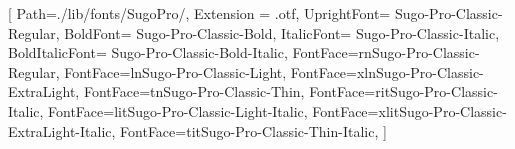 \setmainfont{SugoPro}[
    Path=./lib/fonts/SugoPro/,
    Extension = .otf,
    UprightFont=     Sugo-Pro-Classic-Regular,
    BoldFont=        Sugo-Pro-Classic-Bold,
    ItalicFont=      Sugo-Pro-Classic-Italic,
    BoldItalicFont=  Sugo-Pro-Classic-Bold-Italic,
    FontFace={r}{n}{Sugo-Pro-Classic-Regular},
    FontFace={l}{n}{Sugo-Pro-Classic-Light},
    FontFace={xl}{n}{Sugo-Pro-Classic-ExtraLight},
    FontFace={t}{n}{Sugo-Pro-Classic-Thin},
    FontFace={r}{it}{Sugo-Pro-Classic-Italic},
    FontFace={l}{it}{Sugo-Pro-Classic-Light-Italic},
    FontFace={xl}{it}{Sugo-Pro-Classic-ExtraLight-Italic},
    FontFace={t}{it}{Sugo-Pro-Classic-Thin-Italic},
    ]
\newcommand{\regular}[1]{%
    {\rmfamily \fontseries{r}\selectfont #1}
}
\newcommand{\light}[1]{%
    {\rmfamily \fontseries{l}\selectfont #1}
}
\newcommand{\extralight}[1]{%
    {\rmfamily \fontseries{xl}\selectfont #1}
}
\newcommand{\thin}[1]{%
    {\rmfamily \fontseries{t}\selectfont #1}
}


\renewcommand*{\thefootnote}{%
    \thin{\arabic{footnote}}
}

\newcommand{\annotate}[2]{%
    \glqq #1\grqq \footnotemark \footnotetext{\thin{#2}} \hspace{-1.5ex}
}

%
